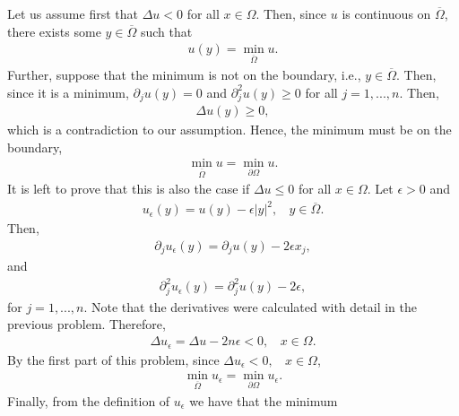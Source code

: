 \begin{questions}
\begin{solution}
Let us assume first that $\Delta u < 0$ for all $x\in\Omega$. Then, since $u$ is continuous on $\overline{\Omega}$, there exists some $y\in\overline{\Omega}$ such that
\begin{align*}
u(y)=\min_{\overline{\Omega}}u.
\end{align*}
Further, suppose that the minimum is not on the boundary, i.e., $y\in\overline{\Omega}$. Then, since it is a minimum, $\partial_ju(y)=0$ and $\partial^2_ju(y)\geq0$ for all $j=1,...,n$. Then,
\begin{align*}
\Delta u(y)\geq 0,
\end{align*}
which is a contradiction to our assumption. Hence, the minimum must be on the boundary,
\begin{align*}
\min_{\overline{\Omega}}u = \min_{\partial\Omega}u.
\end{align*}
It is left to prove that this is also the case if $\Delta u\leq 0$ for all $x\in\Omega$. Let $\epsilon>0$ and
\begin{align*}
u_{\epsilon}(y)=u(y)-\epsilon|y|^2,~~~~y\in\overline{\Omega}.
\end{align*}
Then,
\begin{align*}
\partial_ju_{\epsilon}(y)=\partial_ju(y)-2\epsilon x_j,
\end{align*}
and
\begin{align*}
\partial_j^2u_{\epsilon}(y)=\partial_j^2u(y)-2\epsilon,
\end{align*}
for $j=1,...,n$. Note that the derivatives were calculated with detail in the previous problem. Therefore,
\begin{align*}
\Delta u_{\epsilon}=\Delta u-2n\epsilon<0,~~~~x\in\Omega.
\end{align*}
By the first part of this problem, since $\Delta u_{\epsilon}<0,~~~~x\in\Omega$,
\begin{align*}
\min_{\overline{\Omega}}u_{\epsilon} = \min_{\partial\Omega}u_{\epsilon}.
\end{align*}
Finally, from the definition of $u_{\epsilon}$ we have that the minimum

\end{solution}
\end{questions}
